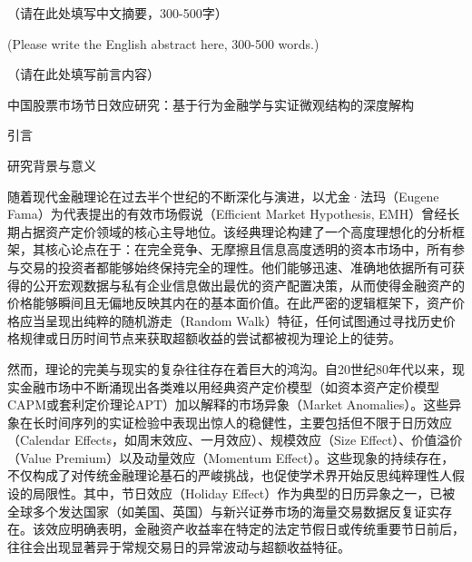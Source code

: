 \documentclass{cupb-thesis}
\begin{document}

\makecover

\makestatement

\begin{cnabstract}
（请在此处填写中文摘要，300-500字）
\end{cnabstract}

\begin{enabstract}
(Please write the English abstract here, 300-500 words.)
\end{enabstract}

\tableofcontents

\begin{preface}
（请在此处填写前言内容）
\end{preface}

\mainmatterstart
中国股票市场节日效应研究：基于行为金融学与实证微观结构的深度解构

引言

研究背景与意义

随着现代金融理论在过去半个世纪的不断深化与演进，以尤金·法玛（Eugene Fama）为代表提出的有效市场假说（Efficient Market Hypothesis, EMH）曾经长期占据资产定价领域的核心主导地位。该经典理论构建了一个高度理想化的分析框架，其核心论点在于：在完全竞争、无摩擦且信息高度透明的资本市场中，所有参与交易的投资者都能够始终保持完全的理性。他们能够迅速、准确地依据所有可获得的公开宏观数据与私有企业信息做出最优的资产配置决策，从而使得金融资产的价格能够瞬间且无偏地反映其内在的基本面价值。在此严密的逻辑框架下，资产价格应当呈现出纯粹的随机游走（Random Walk）特征，任何试图通过寻找历史价格规律或日历时间节点来获取超额收益的尝试都被视为理论上的徒劳。


然而，理论的完美与现实的复杂往往存在着巨大的鸿沟。自20世纪80年代以来，现实金融市场中不断涌现出各类难以用经典资产定价模型（如资本资产定价模型CAPM或套利定价理论APT）加以解释的市场异象（Market Anomalies）。这些异象在长时间序列的实证检验中表现出惊人的稳健性，主要包括但不限于日历效应（Calendar Effects，如周末效应、一月效应）、规模效应（Size Effect）、价值溢价（Value Premium）以及动量效应（Momentum Effect）。这些现象的持续存在，不仅构成了对传统金融理论基石的严峻挑战，也促使学术界开始反思纯粹理性人假设的局限性。其中，节日效应（Holiday Effect）作为典型的日历异象之一，已被全球多个发达国家（如美国、英国）与新兴证券市场的海量交易数据反复证实存在。该效应明确表明，金融资产收益率在特定的法定节假日或传统重要节日前后，往往会出现显著异于常规交易日的异常波动与超额收益特征。
\end{document}
